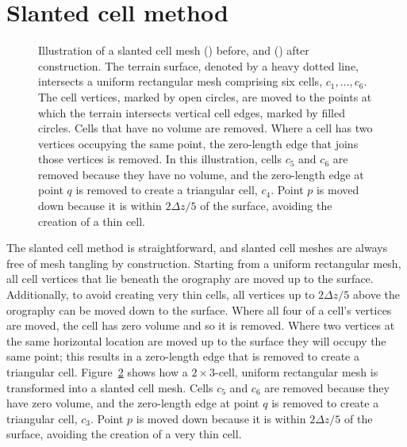 \section{Slanted cell method}
\label{sec:slanted:method}

\begin{figure}
\centering
\begin{subfigure}{\textwidth}
	\centering
	
	\label{fig:slanted:construct-mesh:before}
	\label{fig:slanted:construct-mesh:after}
\end{subfigure}
\caption{Illustration of a slanted cell mesh
() before, and
() after construction.
	The terrain surface, denoted by a heavy dotted line, intersects a uniform rectangular mesh comprising six cells, $c_1, \ldots, c_6$.
	The cell vertices, marked by open circles, are moved to the points at which the terrain intersects vertical cell edges, marked by filled circles.  Cells that have no volume are removed.  Where a cell has two vertices occupying the same point, the zero-length edge that joins those vertices is removed.
	In this illustration, cells $c_5$ and $c_6$ are removed because they have no volume, and the zero-length edge at point $q$ is removed to create a triangular cell, $c_4$.
	Point $p$ is moved down because it is within $2 \Delta z/5$ of the surface, avoiding the creation of a thin cell.}
\label{fig:slanted:construct-mesh}
\end{figure}

The slanted cell method is straightforward, and slanted cell meshes are always free of mesh tangling by construction.
Starting from a uniform rectangular mesh, all cell vertices that lie beneath the orography are moved up to the surface.
Additionally, to avoid creating very thin cells, all vertices up to $2 \Delta z/5$ above the orography can be moved down to the surface.
Where all four of a cell's vertices are moved, the cell has zero volume and so it is removed.  Where two vertices at the same horizontal location are moved up to the surface they will occupy the same point; this results in a zero-length edge that is removed to create a triangular cell.
Figure~\ref{fig:slanted:construct-mesh} shows how a $2 \times 3$-cell, uniform rectangular mesh is transformed into a slanted cell mesh.  Cells $c_5$ and $c_6$ are removed because they have zero volume, and the zero-length edge at point $q$ is removed to create a triangular cell, $c_3$.
Point $p$ is moved down because it is within $2\Delta z/5$ of the surface, avoiding the creation of a very thin cell.

